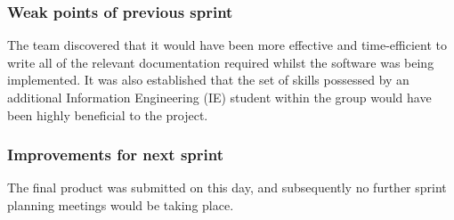 \documentclass[journal,comsoc,onecolumn]{IEEEtran}
\begin{document}
\subsubsection{Weak points of previous sprint}
\hfill \break The team discovered that it would have been more effective and time-efficient to write all of the relevant documentation required whilst the software was being implemented.
\break It was also established that the set of skills possessed by an additional Information Engineering (IE) student within the group would have  been highly beneficial to the project.

\subsubsection{Improvements for next sprint}
\hfill \break The final product was submitted on this day, and subsequently no further sprint planning meetings would be taking place.

\end{document}
